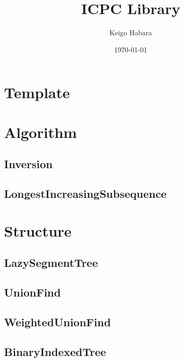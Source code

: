 \documentclass[titlepage, landscape, a4paper, twocolumn, 10pt]{jarticle}
\begin{document}
\title{ICPC Library}
\author{Keigo Habara}
\date{\today}

\maketitle


\section{Template}




\section{Algorithm}

\subsection{Inversion}


\subsection{LongestIncreasingSubsequence}



\section{Structure}

\subsection{LazySegmentTree}


\subsection{UnionFind}


\subsection{WeightedUnionFind}


\subsection{BinaryIndexedTree}

\end{document}
